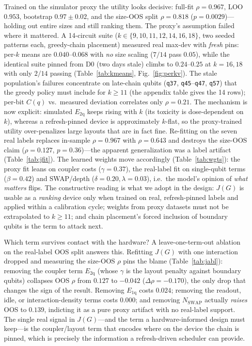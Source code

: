 \documentclass[journal,10pt,twocolumn]{IEEEtran}
\newcommand{\q}[1]{\texttt{q#1}}
\begin{document}
Trained on the simulator proxy the utility looks decisive: full-fit $\rho{=}0.967$, LOO $0.953$, bootstrap
$0.97{\pm}0.02$, and the size-OOS split $\rho{=}0.818$ ($p{=}0.0029$)---holding out entire sizes and still ranking
them. The proxy's assumption failed where it mattered. A 14-circuit suite
($k\in\{9,10,11,12,14,16,18\}$, two seeded patterns each, greedy-chain placement) measured real max-dev with
\emph{fresh} pins: per-$k$ means are $0.040$--$0.068$ with \emph{no} size scaling ($7/14$ pass $0.05$), while the
identical suite pinned from D0 (two days stale) climbs to $0.24$--$0.25$ at $k{=}16,18$ with only $2/14$ passing
(Table~\ref{tab:kmeans}, Fig.~\ref{fig:perkv}). The stale population's failures concentrate on late-chain qubits
(\q{37}, \q{45}--\q{47}, \q{57}) that the greedy policy must include for $k\ge11$ (the appendix table gives the
14 rows); per-bit $C(q)$ vs.\ measured deviation correlates only $\rho{=}0.21$. The mechanism is now explicit:
simulated $E_{\mathrm{2q}}$ keeps rising with $k$ (its toxicity is dose-dependent on $k$), whereas a refresh-pinned
device is approximately $k$-flat, so the proxy-trained utility over-penalizes large layouts that are in fact fine.
Re-fitting on the seven real labels replaces in-sample $\rho{=}0.967$ with $\rho{=}0.643$ and destroys the
size-OOS claim ($\rho{=}0.127$, $p{=}0.36$)---the apparent generalization was a label artifact
(Table~\ref{tab:jfit}). The learned weights move accordingly (Table~\ref{tab:wgts}): the proxy fit leans on coupler
costs ($\gamma{=}0.37$), the real-label fit on single-qubit terms ($\beta{=}0.42$) and SWAP/depth
($\delta{=}0.20,\lambda{=}0.03$), i.e.\ the model's opinion of \emph{what matters} flips. The constructive reading is
what we adopt in the design: $J(G)$ is usable as a \emph{ranking} device only when trained on real, refresh-pinned
labels and applied within a calibration cycle; weights from proxy datasets must not be extrapolated to $k\ge11$;
and chain placement's forced inclusion of boundary qubits is the term to attack next.

Which term survives contact with the hardware? A leave-one-term-out ablation on the real-label OOS split answers
this. Refitting $J(G)$ with one interaction dropped and measuring the size-OOS $\rho$ pins the blame (Table~\ref{tab:jabl}):
removing the coupler term $E_{\mathrm{2q}}$ (whose $\gamma$ is the layout penalty against boundary qubits) collapses
OOS $\rho$ from $0.127$ to $-0.042$ ($\Delta\rho{=}-0.170$), the only drop that changes the sign of the result.
Removing $E_{\mathrm{1q}}$ costs $0.024$; removing the readout, idle, or interaction-density terms costs $0.000$;
and removing $N_{\mathrm{SWAP}}$ actually \emph{raises} OOS to $0.139$, indicting it as a pure proxy artifact with no
real-label support. The single real signal in $J(G)$---and the term a hardware-informed design must keep---is the
coupler/layout term that encodes where on the device the chain is pinned, which is precisely the information a
refresh-driven scheduler can provide.
\end{document}
